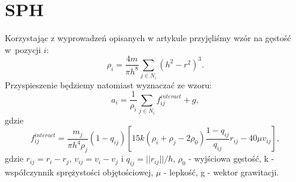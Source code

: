 \section{SPH}
Korzystając z wyprowadzeń opisanych w artykule \cite{website:derive} przyjęliśmy wzór na gęstość w~pozycji $i$:
\[ \rho_i = \frac{4m}{\pi h^8} \sum\limits_{j\in N_i} (h^2-r^2)^3.\]
Przyspieszenie będziemy natomiast wyznaczać ze wzoru:
\[ a_i = \frac{1}{\rho_i} \sum\limits_{j\in N_i } f_{ij}^{interact} + g ,\]
gdzie
\[ f_{ij}^{interact} = \frac{m_j}{\pi h^4 \rho_j} (1-q_{ij})\left[15k(\rho_i+\rho_j-2\rho_0) 
\frac{1-q_{ij}}{q_{ij}} r_{ij} - 40\mu v_{ij} \right] ,\]
gdzie $r_{ij} = r_i - r_j$, $v_{ij} = v_i - v_j$ i $q_{ij} = || r_{ij} || /h$, $\rho_0$ - wyjściowa gęstość, k - współczynnik sprężystości objętościowej, $\mu$ - lepkość, g - wektor grawitacji.
